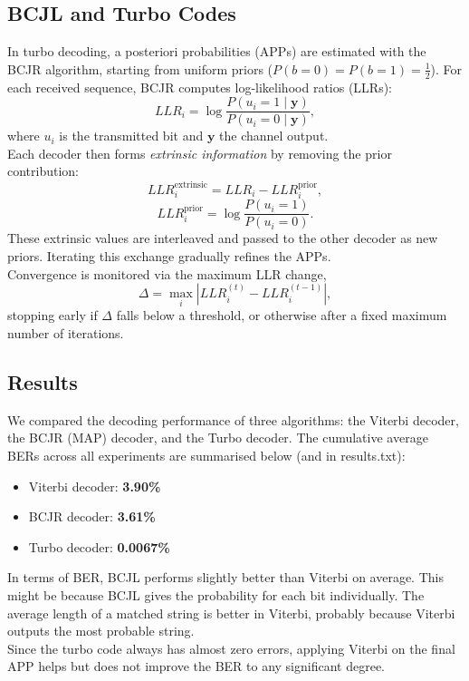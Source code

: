 \subsection{BCJL and Turbo Codes}
In turbo decoding, a posteriori probabilities (APPs) are estimated with the BCJR algorithm, starting from uniform priors ($P(b=0)=P(b=1)=\tfrac{1}{2}$). For each received sequence, BCJR computes log-likelihood ratios (LLRs):
\[
    LLR_i = \log \frac{P(u_i=1 \mid \mathbf{y})}{P(u_i=0 \mid \mathbf{y})},
\]
where $u_i$ is the transmitted bit and $\mathbf{y}$ the channel output.
\\Each decoder then forms \emph{extrinsic information} by removing the prior 
contribution:
\[
    LLR^{\text{extrinsic}}_i = LLR_i - LLR^{\text{prior}}_i,
\] 
\[
    LLR^{\text{prior}}_i = \log \frac{P(u_i=1)}{P(u_i=0)}.
\]
These extrinsic values are interleaved and passed to the other decoder as new priors. Iterating this exchange gradually refines the APPs.
\\Convergence is monitored via the maximum LLR change,
\[
    \Delta = \max_i \left| LLR^{(t)}_i - LLR^{(t-1)}_i \right|,
\]
stopping early if $\Delta$ falls below a threshold, or otherwise after a fixed maximum number of iterations.

\subsection{Results}
We compared the decoding performance of three algorithms: the Viterbi decoder, 
the BCJR (MAP) decoder, and the Turbo decoder. The cumulative average BERs across 
all experiments are summarised below (and in results.txt):

\begin{itemize}
    \item Viterbi decoder: \textbf{3.90\%}
    \item BCJR decoder: \textbf{3.61\%}
    \item Turbo decoder: \textbf{0.0067\%}
\end{itemize}
In terms of BER, BCJL performs slightly better than Viterbi on average. This might be because BCJL gives the probability for each bit individually. The average length of a matched string is better in Viterbi, probably because Viterbi outputs the most probable string.
\\Since the turbo code always has almost zero errors, applying Viterbi on the final APP helps but does not improve the BER to any significant degree.